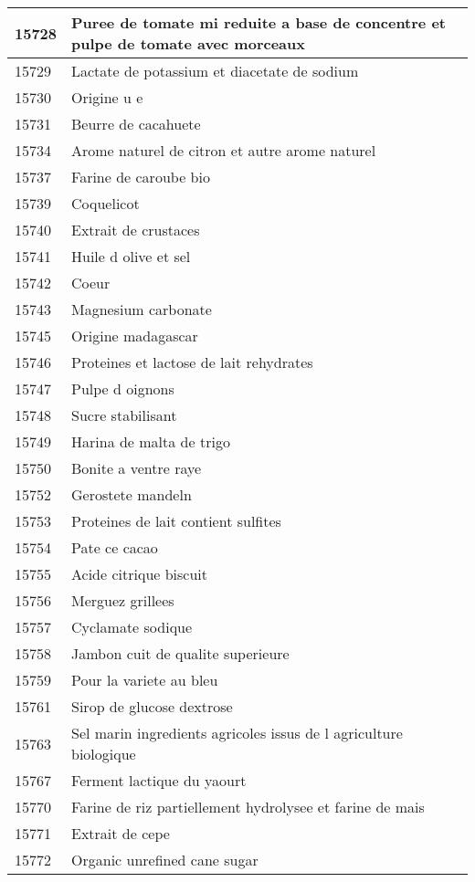\begin{longtable}{|l|l|}
15728 & Puree de tomate mi reduite a base de concentre et pulpe de tomate avec morceaux \\ \hline 
15729 & Lactate de potassium et diacetate de sodium \\ \hline 
15730 & Origine u e \\ \hline 
15731 & Beurre de cacahuete \\ \hline 
15734 & Arome naturel de citron et autre arome naturel \\ \hline 
15737 & Farine de caroube bio \\ \hline 
15739 & Coquelicot \\ \hline 
15740 & Extrait de crustaces \\ \hline 
15741 & Huile d olive et sel \\ \hline 
15742 & Coeur \\ \hline 
15743 & Magnesium carbonate \\ \hline 
15745 & Origine madagascar \\ \hline 
15746 & Proteines et lactose de lait rehydrates \\ \hline 
15747 & Pulpe d oignons \\ \hline 
15748 & Sucre stabilisant \\ \hline 
15749 & Harina de malta de trigo \\ \hline 
15750 & Bonite a ventre raye \\ \hline 
15752 & Gerostete mandeln \\ \hline 
15753 & Proteines de lait contient sulfites \\ \hline 
15754 & Pate ce cacao \\ \hline 
15755 & Acide citrique biscuit \\ \hline 
15756 & Merguez grillees \\ \hline 
15757 & Cyclamate sodique \\ \hline 
15758 & Jambon cuit de qualite superieure \\ \hline 
15759 & Pour la variete au bleu \\ \hline 
15761 & Sirop de glucose dextrose \\ \hline 
15763 & Sel marin ingredients agricoles issus de l agriculture biologique \\ \hline 
15767 & Ferment lactique du yaourt \\ \hline 
15770 & Farine de riz partiellement hydrolysee et farine de mais \\ \hline 
15771 & Extrait de cepe \\ \hline 
15772 & Organic unrefined cane sugar \\ \hline 

\end{longtable}
